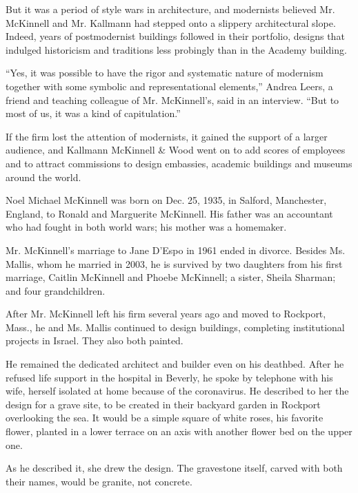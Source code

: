 But it was a period of style wars in architecture, and modernists
believed Mr. McKinnell and Mr. Kallmann had stepped onto a slippery
architectural slope. Indeed, years of postmodernist buildings followed
in their portfolio, designs that indulged historicism and traditions
less probingly than in the Academy building.

``Yes, it was possible to have the rigor and systematic nature of
modernism together with some symbolic and representational elements,''
Andrea Leers, a friend and teaching colleague of Mr. McKinnell's, said
in an interview. ``But to most of us, it was a kind of capitulation.''

If the firm lost the attention of modernists, it gained the support of a
larger audience, and Kallmann McKinnell \& Wood went on to add scores of
employees and to attract commissions to design embassies, academic
buildings and museums around the world.

Noel Michael McKinnell was born on Dec. 25, 1935, in Salford,
Manchester, England, to Ronald and Marguerite McKinnell. His father was
an accountant who had fought in both world wars; his mother was a
homemaker.

Mr. McKinnell's marriage to Jane D'Espo in 1961 ended in divorce.
Besides Ms. Mallis, whom he married in 2003, he is survived by two
daughters from his first marriage, Caitlin McKinnell and Phoebe
McKinnell; a sister, Sheila Sharman; and four grandchildren.

After Mr. McKinnell left his firm several years ago and moved to
Rockport, Mass., he and Ms. Mallis continued to design buildings,
completing institutional projects in Israel. They also both painted.

He remained the dedicated architect and builder even on his deathbed.
After he refused life support in the hospital in Beverly, he spoke by
telephone with his wife, herself isolated at home because of the
coronavirus. He described to her the design for a grave site, to be
created in their backyard garden in Rockport overlooking the sea. It
would be a simple square of white roses, his favorite flower, planted in
a lower terrace on an axis with another flower bed on the upper one.

As he described it, she drew the design. The gravestone itself, carved
with both their names, would be granite, not concrete.

\href{https://www.nytimes.com/interactive/2020/obituaries/people-died-coronavirus-obituaries.html?action=click\&pgtype=Article\&state=default\&region=BELOW_MAIN_CONTENT\&context=covid_obits_promo}{}


